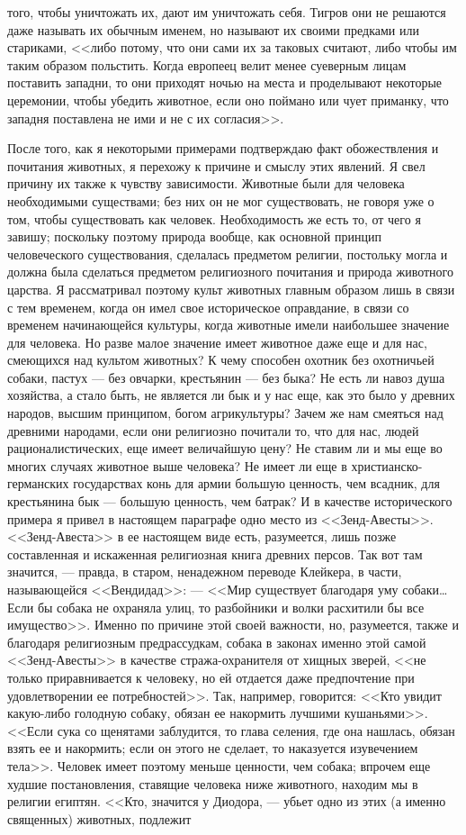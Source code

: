 \documentclass[12pt]{article}
\begin{document}
того, чтобы уничтожать их, дают им уничтожать себя. Тигров они не решаются даже называть их обычным именем, но называют их своими предками или стариками, <<либо потому, что они сами их за таковых считают, либо чтобы им таким образом польстить. Когда европеец велит менее суеверным лицам поставить западни, то они приходят ночью на места и проделывают некоторые церемонии, чтобы убедить животное, если оно поймано или чует приманку, что западня поставлена не ими и не с их согласия>>. 

После того, как я некоторыми примерами подтверждаю факт обожествления и почитания животных, я перехожу к причине и смыслу этих явлений. Я свел причину их также к чувству зависимости. Животные были для человека необходимыми существами; без них он не мог существовать, не говоря уже о том, чтобы существовать как человек. Необходимость же есть то, от чего я завишу; поскольку поэтому природа вообще, как основной принцип человеческого существования, сделалась предметом религии, постольку могла и должна была сделаться предметом религиозного почитания и природа животного царства. Я рассматривал поэтому культ животных главным образом лишь в связи с тем временем, когда он имел свое историческое оправдание, в связи со временем начинающейся культуры, когда животные имели наибольшее значение для человека. Но разве малое значение имеет животное даже еще и для нас, смеющихся над культом животных? К чему способен охотник без охотничьей собаки, пастух --- без овчарки, крестьянин --- без быка? Не есть ли навоз душа хозяйства, а стало быть, не является ли бык и у нас еще, как это было у древних народов, высшим принципом, богом агрикультуры? Зачем же нам смеяться над древними народами, если они религиозно почитали то, что для нас, людей рационалистических, еще имеет величайшую цену? Не ставим ли и мы еще во многих случаях животное выше человека? Не имеет ли еще в христианско-германских государствах конь для армии большую ценность, чем всадник, для крестьянина бык --- большую ценность, чем батрак? И в качестве исторического примера я привел в настоящем параграфе одно место из <<Зенд-Авесты>>. <<Зенд-Авеста>> в ее настоящем виде есть, разумеется, лишь позже составленная и искаженная религиозная книга древних персов. Так вот там значится, --- правда, в старом, ненадежном переводе Клейкера, в части, называющейся <<Вендидад>>: --- <<Мир существует благодаря уму собаки\dots Если бы собака не охраняла улиц, то разбойники и волки расхитили бы все имущество>>. Именно по причине этой своей важности, но, разумеется, также и благодаря религиозным предрассудкам, собака в законах именно этой самой <<Зенд-Авесты>>  в качестве стража-охранителя от хищных зверей, <<не только приравнивается к человеку, но ей отдается даже предпочтение при удовлетворении ее потребностей>>. Так, например, говорится: <<Кто увидит какую-либо голодную собаку, обязан ее накормить лучшими кушаньями>>. <<Если сука со щенятами заблудится, то глава селения, где она нашлась, обязан взять ее и накормить; если он этого не сделает, то наказуется изувечением тела>>. Человек имеет поэтому меньше ценности, чем собака; впрочем еще худшие постановления, ставящие человека ниже животного, находим мы в религии египтян. <<Кто, значится у Диодора, --- убьет одно из этих (а именно священных) животных, подлежит 
\end{document}
